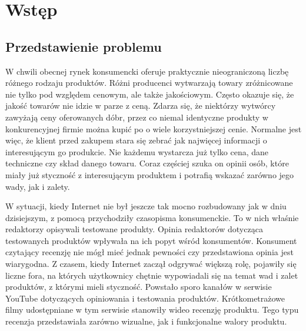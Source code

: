 \chapter{Wstęp}

\section{Przedstawienie problemu}
W chwili obecnej rynek konsumencki oferuje praktycznie nieograniczoną liczbę różnego rodzaju produktów. Różni producenci wytwarzają towary zróżnicowane nie tylko pod względem cenowym, ale także jakościowym. Często okazuje się, że jakość towarów nie idzie w parze z ceną. Zdarza się, że niektórzy wytwórcy  zawyżają ceny oferowanych dóbr, przez co niemal identyczne produkty w konkurencyjnej firmie można kupić po o wiele korzystniejszej cenie. Normalne jest więc, że klient przed zakupem stara się zebrać jak najwięcej informacji o interesującym go produkcie. Nie każdemu wystarcza już tylko cena, dane techniczne czy skład danego towaru.  Coraz częściej szuka on opinii osób, które miały już styczność z interesującym produktem i potrafią wskazać zarówno jego wady, jak i zalety. 

W sytuacji, kiedy Internet nie był jeszcze tak mocno rozbudowany jak w dniu dzisiejszym, z pomocą przychodziły czasopisma konsumenckie. To w nich właśnie redaktorzy opisywali testowane produkty. Opinia redaktorów dotycząca testowanych produktów wpływała na ich popyt wśród konsumentów. Konsument czytający recenzję nie mógł mieć jednak pewności czy przedstawiona opinia jest wiarygodna. Z czasem, kiedy Internet zaczął odgrywać większą rolę, pojawiły się liczne fora, na których użytkownicy chętnie wypowiadali się na temat wad i zalet produktów, z którymi mieli styczność. Powstało sporo kanałów w serwisie YouTube dotyczących opiniowania i testowania produktów. Krótkometrażowe filmy udostępniane w tym serwisie stanowiły wideo recenzję produktu.  Tego typu recenzja przedstawiała zarówno wizualne, jak i funkcjonalne walory produktu. 

